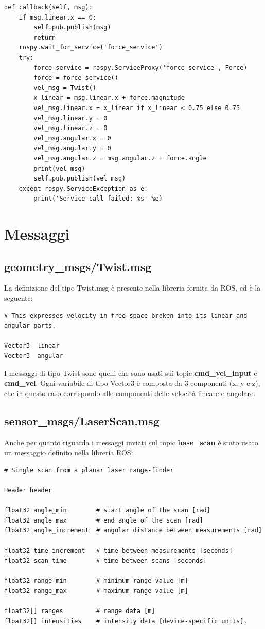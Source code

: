 \documentclass[Lau, binding=0.6cm, oneside]{sapthesis}
\begin{document}
\begin{lstlisting}
def callback(self, msg):
    if msg.linear.x == 0:
        self.pub.publish(msg)
        return
    rospy.wait_for_service('force_service')
    try:
        force_service = rospy.ServiceProxy('force_service', Force)
        force = force_service()
        vel_msg = Twist()
        x_linear = msg.linear.x + force.magnitude
        vel_msg.linear.x = x_linear if x_linear < 0.75 else 0.75
        vel_msg.linear.y = 0
        vel_msg.linear.z = 0
        vel_msg.angular.x = 0
        vel_msg.angular.y = 0
        vel_msg.angular.z = msg.angular.z + force.angle
        print(vel_msg)
        self.pub.publish(vel_msg)
    except rospy.ServiceException as e:
        print('Service call failed: %s' %e)
\end{lstlisting}

\section{Messaggi}
\subsection{geometry\_msgs/Twist.msg}
La definizione del tipo Twist.msg è presente nella libreria fornita da ROS, ed è la seguente\cite{fonte5}:
\begin{lstlisting}
# This expresses velocity in free space broken into its linear and angular parts.

Vector3  linear
Vector3  angular
\end{lstlisting}
I messaggi di tipo Twist sono quelli che sono usati sui topic \textbf{cmd\_vel\_input} e \textbf{cmd\_vel}.
Ogni variabile di tipo Vector3 è composta da 3 componenti (x, y e z), che in questo caso corrispondo alle componenti delle velocità lineare e angolare.

\subsection{sensor\_msgs/LaserScan.msg}
Anche per quanto riguarda i messaggi inviati sul topic \textbf{base\_scan} è stato usato un messaggio definito nella libreria ROS\cite{fonte6}:
\begin{lstlisting}
# Single scan from a planar laser range-finder

Header header

float32 angle_min        # start angle of the scan [rad]
float32 angle_max        # end angle of the scan [rad]
float32 angle_increment  # angular distance between measurements [rad]

float32 time_increment   # time between measurements [seconds]
float32 scan_time        # time between scans [seconds]

float32 range_min        # minimum range value [m]
float32 range_max        # maximum range value [m]

float32[] ranges         # range data [m]
float32[] intensities    # intensity data [device-specific units].
\end{lstlisting}
\end{document}
